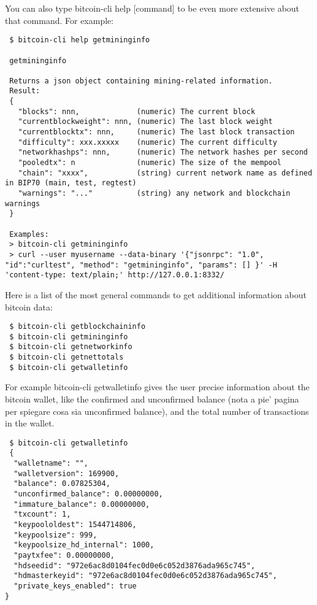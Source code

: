 \bigskip
\noindent
You can also type \colorbox{Grey!10}{bitcoin-cli help [command]} to be even more extensive about that command. For example:
\bigskip
\begin{lstlisting}
 $ bitcoin-cli help getmininginfo
 
 getmininginfo

 Returns a json object containing mining-related information.
 Result:
 {
   "blocks": nnn,             (numeric) The current block
   "currentblockweight": nnn, (numeric) The last block weight
   "currentblocktx": nnn,     (numeric) The last block transaction
   "difficulty": xxx.xxxxx    (numeric) The current difficulty
   "networkhashps": nnn,      (numeric) The network hashes per second
   "pooledtx": n              (numeric) The size of the mempool
   "chain": "xxxx",           (string) current network name as defined in BIP70 (main, test, regtest)
   "warnings": "..."          (string) any network and blockchain warnings
 }

 Examples:
 > bitcoin-cli getmininginfo 
 > curl --user myusername --data-binary '{"jsonrpc": "1.0", "id":"curltest", "method": "getmininginfo", "params": [] }' -H 'content-type: text/plain;' http://127.0.0.1:8332/
\end{lstlisting}
\bigskip
\noindent
Here is a list of the most general commands to get additional information about bitcoin data:
\bigskip
\begin{lstlisting}
 $ bitcoin-cli getblockchaininfo
 $ bitcoin-cli getmininginfo
 $ bitcoin-cli getnetworkinfo
 $ bitcoin-cli getnettotals
 $ bitcoin-cli getwalletinfo
\end{lstlisting}
\bigskip
\noindent
For example \colorbox{Grey!10}{bitcoin-cli getwalletinfo} gives the user precise information about the bitcoin wallet, like the confirmed and unconfirmed balance (nota a pie' pagina per spiegare cosa sia unconfirmed balance), and the total number of transactions in the wallet.
\bigskip
\begin{lstlisting}
 $ bitcoin-cli getwalletinfo
 {
  "walletname": "",
  "walletversion": 169900,
  "balance": 0.07825304,
  "unconfirmed_balance": 0.00000000,
  "immature_balance": 0.00000000,
  "txcount": 1,
  "keypoololdest": 1544714806,
  "keypoolsize": 999,
  "keypoolsize_hd_internal": 1000,
  "paytxfee": 0.00000000,
  "hdseedid": "972e6ac8d0104fec0d0e6c052d3876ada965c745",
  "hdmasterkeyid": "972e6ac8d0104fec0d0e6c052d3876ada965c745",
  "private_keys_enabled": true
}
\end{lstlisting}

